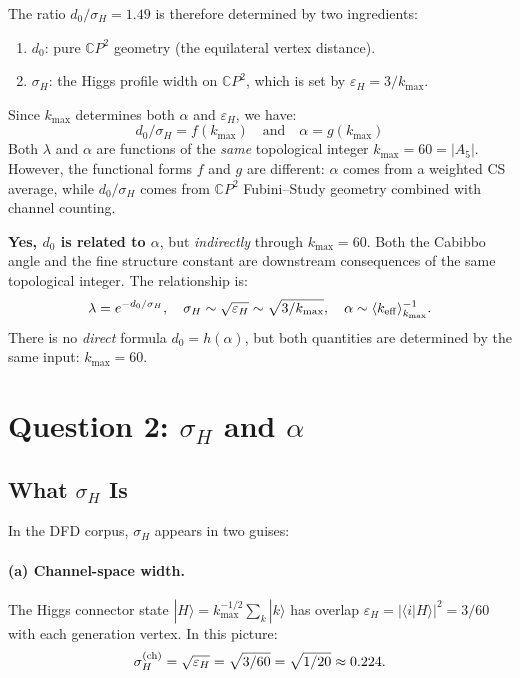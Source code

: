 \documentclass[11pt]{article}
\newcommand{\CP}{\mathbb{C}P}
\theoremstyle{remark}
\begin{document}
The ratio $d_0/\sigma_H = 1.49$ is therefore determined by two ingredients:
\begin{enumerate}
\item $d_0$: pure $\CP^2$ geometry (the equilateral vertex distance).
\item $\sigma_H$: the Higgs profile width on $\CP^2$, which is set by
  $\varepsilon_H = 3/k_{\max}$.
\end{enumerate}

Since $k_{\max}$ determines both $\alpha$ and $\varepsilon_H$, we have:
\begin{equation}
\boxed{d_0/\sigma_H = f(k_{\max}) \quad \text{and} \quad \alpha = g(k_{\max})}
\end{equation}
Both $\lambda$ and $\alpha$ are functions of the \emph{same} topological
integer $k_{\max} = 60 = |A_5|$. However, the functional forms $f$ and $g$
are different: $\alpha$ comes from a weighted CS average, while $d_0/\sigma_H$
comes from $\CP^2$ Fubini--Study geometry combined with channel counting.

\begin{tcolorbox}[colback=blue!5!white, colframe=blue!50!black,
  title=Verdict: $d_0$ and $\alpha$]
\textbf{Yes, $d_0$ is related to $\alpha$}, but \emph{indirectly}
through $k_{\max} = 60$. Both the Cabibbo angle and the fine structure
constant are downstream consequences of the same topological integer.
The relationship is:
\[
\lambda = e^{-d_0/\sigma_H}, \quad
\sigma_H \sim \sqrt{\varepsilon_H} \sim \sqrt{3/k_{\max}}, \quad
\alpha \sim \langle k_{\rm eff}\rangle^{-1}_{k_{\max}}.
\]
There is no \emph{direct} formula $d_0 = h(\alpha)$, but both
quantities are determined by the same input: $k_{\max} = 60$.
\end{tcolorbox}

\section{Question 2: $\sigma_H$ and $\alpha$}
\label{sec:sigma}

\subsection{What $\sigma_H$ Is}

In the DFD corpus, $\sigma_H$ appears in two guises:

\paragraph{(a) Channel-space width.}
The Higgs connector state $|H\rangle = k_{\max}^{-1/2}\sum_k |k\rangle$
has overlap $\varepsilon_H = |\langle i|H\rangle|^2 = 3/60$ with each
generation vertex. In this picture:
\begin{equation}
\sigma_H^{\rm (ch)} = \sqrt{\varepsilon_H} = \sqrt{3/60} = \sqrt{1/20} \approx 0.224.
\end{equation}
\end{document}
